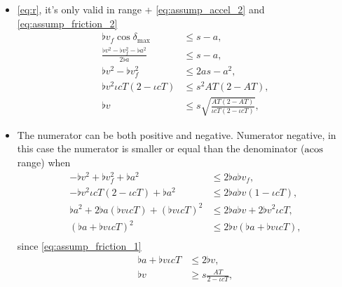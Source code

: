\begin{itemize}
\item
\eqref{eq:r}, it's only valid in range + \eqref{eq:assump_accel_2} and \eqref{eq:assump_friction_2}
\begin{align*}
\flat{v}_f \cos\delta_{\max} &\le s - a,\\
\frac{\flat{v}^2 - \flat{v}_f^2 - \flat{a}^2}{2 \flat{a}}&\le s - a,\\
\flat{v}^2 - \flat{v}_f^2 &\le 2 a s - a^2,\\
\flat{v}^2 \iota cT(2 - \iota cT)&\le s^2 AT(2 - AT),\\
\flat{v} &\le s \sqrt{\frac{AT(2 - AT)}{\iota cT(2 - \iota cT)}},
\end{align*}

\item
The numerator can be both positive and negative. Numerator negative, in this case the numerator is smaller or equal than the denominator ($\operatorname{acos}$ range) when
\begin{align*}
-\flat{v}^2 + \flat{v}_f^2 + \flat{a}^2 &\le 2 \flat{a} \flat{v}_f,\\
-\flat{v}^2 \iota cT (2 - \iota cT) + \flat{a}^2 &\le 2 \flat{a} \flat{v} (1 - \iota cT),\\
\flat{a}^2 + 2 \flat{a} (\flat{v} \iota cT) + (\flat{v} \iota cT)^2 &\le 2 \flat{a} \flat{v} + 2 \flat{v}^2 \iota cT,\\
(\flat{a} + \flat{v} \iota cT)^2 &\le 2 \flat{v} (\flat{a} + \flat{v} \iota cT),\\
\end{align*}
since \eqref{eq:assump_friction_1}
\begin{align*}
\flat{a} + \flat{v} \iota cT &\le 2 \flat{v},\\
\flat{v} &\ge s \frac{AT}{2 - \iota cT},\\
\end{align*}


\end{itemize}
